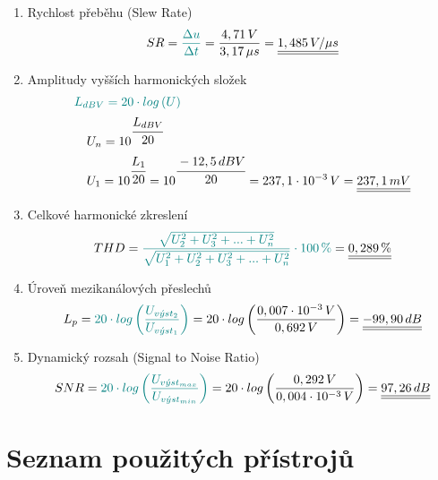 \documentclass[a4paper, czech]{article}
\begin{document}
\begin{enumerate}
    \item Rychlost přeběhu (Slew Rate)
    \begin{multline*}
        SR = \textcolor{teal}{\frac{\Delta u}{\Delta t}} = \frac{4,71 \, V}{3,17 \, \mu s} = \underline{\underline{1,485 \, V / \mu s}} \hfill
    \end{multline*}

    \item Amplitudy vyšších harmonických složek
    \begin{multline*}
        \textcolor{teal}{L_{dBV} = 20 \cdot log \left( U \right)} \hfill \\
        \ \ \ U_n = 10^{\cfrac{L_{dBV}}{20}} \hfill \\
        \ \ \ U_1 = 10^{\cfrac{L_1}{20}} = 10^{\cfrac{-12,5 \, dBV}{20}} = 237,1 \cdot 10^{-3} \, V = \underline{\underline{237,1\, mV}} \hfill
    \end{multline*}

    \item Celkové harmonické zkreslení
    \begin{multline*}
        THD = \textcolor{teal}{\frac{\sqrt{U_2^2 + U_3^2 + ... + U_n^2}}{\sqrt{U_1^2 + U_2^2 + U_3^2 + ... + U_n^2}} \cdot 100 \, \%} = \underline{\underline{0,289\, \%}} \hfill
    \end{multline*}

    \item Úroveň mezikanálových přeslechů
    \begin{multline*}
        L_p = \textcolor{teal}{20 \cdot log \left( \frac{U_{v \acute{y} st_2}}{U_{v \acute{y} st_1}} \right)} = 20 \cdot log \left( \frac{0,007 \cdot 10^{-3} \, V}{0,692 \, V} \right) = \underline{\underline{-99,90 \, dB}} \hfill
    \end{multline*}

    \item Dynamický rozsah (Signal to Noise Ratio)
    \begin{multline*}
        SNR = \textcolor{teal}{20 \cdot log \left( \frac{U_{v \acute{y} st_{max}}}{U_{v \acute{y} st_{min}}} \right)} = 20 \cdot log \left( \frac{0,292 \, V}{0,004 \cdot 10^{-3} \, V} \right) = \underline{\underline{97,26 \, dB}} \hfill
    \end{multline*}
\end{enumerate}

\section{Seznam použitých přístrojů}
\end{document}
